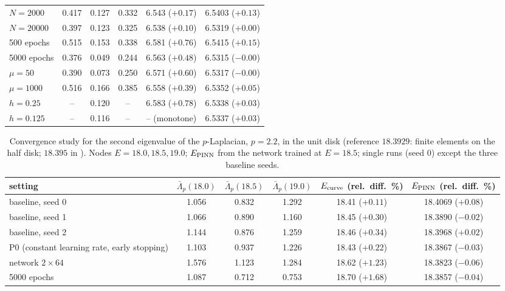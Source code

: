 \documentclass[10pt]{amsart}
\theoremstyle{definition}
\theoremstyle{remark}
\theoremstyle{plain}
\begin{document}
\begin{table}[H]
\begin{tabular}{lccccc}
$N=2000$ & 0.417 & 0.127 & 0.332 & 6.543 ($+0.17$) & 6.5403 ($+0.13$)\\
$N=20000$ & 0.397 & 0.123 & 0.325 & 6.538 ($+0.10$) & 6.5319 ($+0.00$)\\
500 epochs & 0.515 & 0.153 & 0.338 & 6.581 ($+0.76$) & 6.5415 ($+0.15$)\\
5000 epochs & 0.376 & 0.049 & 0.244 & 6.563 ($+0.48$) & 6.5315 ($-0.00$)\\
$\mu=50$ & 0.390 & 0.073 & 0.250 & 6.571 ($+0.60$) & 6.5317 ($-0.00$)\\
$\mu=1000$ & 0.516 & 0.166 & 0.385 & 6.558 ($+0.39$) & 6.5352 ($+0.05$)\\
$h=0.25$ & -- & 0.120 & -- & 6.583 ($+0.78$) & 6.5338 ($+0.03$)\\
$h=0.125$ & -- & 0.116 & -- & -- (monotone) & 6.5337 ($+0.03$)\\
\bottomrule
\end{tabular}
\end{table}

\begin{table}[H]
\centering\small
\caption{Convergence study for the second eigenvalue of the $p$-Laplacian, $p=2.2$, in the unit disk (reference $18.3929$: finite elements on the half disk; $18.395$ in \cite{HJ11}). Nodes $E=18.0,18.5,19.0$; $E_{\rm PINN}$ from the network trained at $E=18.5$; single runs (seed 0) except the three baseline seeds.}
\label{tab.plap.conv2}
\begin{tabular}{lccccc}
\toprule
setting & $\bar\Lambda_p(18.0)$ & $\bar\Lambda_p(18.5)$ & $\bar\Lambda_p(19.0)$ & $E_{\rm curve}$ (rel.\ diff.\ \%) & $E_{\rm PINN}$ (rel.\ diff.\ \%)\\
\midrule
baseline, seed 0 & 1.056 & 0.832 & 1.292 & 18.41 ($+0.11$) & 18.4069 ($+0.08$)\\
baseline, seed 1 & 1.066 & 0.890 & 1.160 & 18.45 ($+0.30$) & 18.3890 ($-0.02$)\\
baseline, seed 2 & 1.144 & 0.876 & 1.259 & 18.46 ($+0.34$) & 18.3968 ($+0.02$)\\
P0 (constant learning rate, early stopping) & 1.103 & 0.937 & 1.226 & 18.43 ($+0.22$) & 18.3867 ($-0.03$)\\
network $2\times64$ & 1.576 & 1.123 & 1.284 & 18.62 ($+1.23$) & 18.3823 ($-0.06$)\\
5000 epochs & 1.087 & 0.712 & 0.753 & 18.70 ($+1.68$) & 18.3857 ($-0.04$)\\
\bottomrule
\end{tabular}
\end{table}
\end{document}
